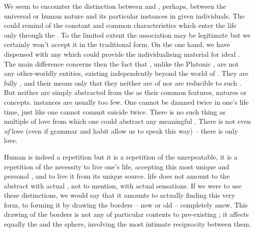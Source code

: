 \pa We seem to encounter the distinction between  and ,
perhaps, between the universal  or human nature and its particular
instances in given individuals. The  could remind of the constant
and common characteristics which enter the life only through the . To the limited extent the association may be legitimate but we
certainly won't accept it in the traditional form.  On the one hand, we have
dispensed with any  which could provide the individualising material
for ideal . The main difference concerns then the fact that
, unlike the Platonic , are not any other-worldly
entities, existing independently beyond the world of .
They are fully , and their  means only that
they neither are  of  nor are reducible to
such .  But neither are  simply abstracted from
the  as their common features, natures or concepts.
 instances are usually too few. One cannot be damned twice in one's
life time, just like one cannot commit suicide twice. There is no such thing as
multiple  of love from which one could abstract any meaningful
. There is not even  {\em of} love (even if
grammar and habit allow us to speak this way) -- there is only 
love.

\pa Human  is indeed a repetition but it is a repetition of the
unrepeatable, it is a repetition of the necessity to live one's life, accepting
this most unique and personal , and to live it from its unique source.
 life does not amount to  the abstract 
with actual , not to mention, with actual sensations. If we were to
use these distinctions, we would say that it amounts to actually finding this
very form, to forming it by drawing the borders -- new or old -- completely
anew. This drawing of the borders is not any  of particular
contents to pre-existing ; it affects equally the  and
the  sphere, involving the most intimate reciprocity between them.

